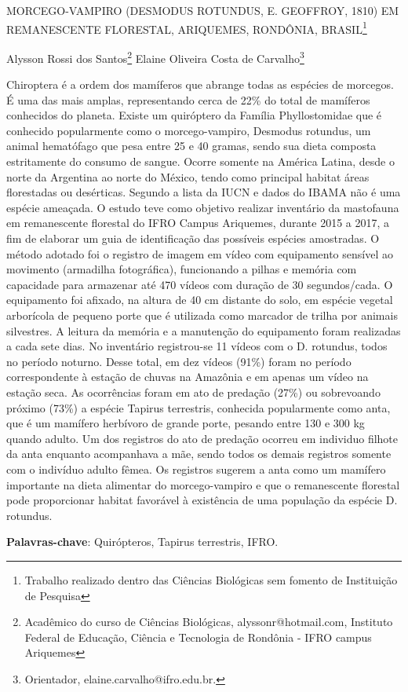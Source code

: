 \documentclass[article,12pt,onesidea,4paper,english,brazil]{abntex2}
\begin{document}
	
	
	\frenchspacing 
	
	\begin{center}
		\LARGE MORCEGO-VAMPIRO \MakeUppercase{(Desmodus rotundus, E. Geoffroy, 1810)} EM
		REMANESCENTE FLORESTAL, ARIQUEMES, RONDÔNIA, BRASIL\footnote{Trabalho realizado dentro das Ciências Biológicas sem fomento de Instituição de Pesquisa}
		
		\normalsize
		Alysson Rossi dos Santos\footnote{Acadêmico do curso de Ciências Biológicas, alyssonr@hotmail.com, Instituto Federal de Educação,
			Ciência e Tecnologia de Rondônia - IFRO campus Ariquemes} 
		Elaine Oliveira Costa de Carvalho\footnote{Orientador, elaine.carvalho@ifro.edu.br.} 
		
	\end{center}
	
	\noindent Chiroptera é a ordem dos mamíferos que abrange todas as espécies de morcegos.
	É uma das mais amplas, representando cerca de 22\% do total de mamíferos
	conhecidos do planeta. Existe um quiróptero da Família Phyllostomidae que é
	conhecido popularmente como o morcego-vampiro, Desmodus rotundus, um animal
	hematófago que pesa entre 25 e 40 gramas, sendo sua dieta composta estritamente
	do consumo de sangue. Ocorre somente na América Latina, desde o norte da
	Argentina ao norte do México, tendo como principal habitat áreas florestadas ou
	desérticas. Segundo a lista da IUCN e dados do IBAMA não é uma espécie
	ameaçada. O estudo teve como objetivo realizar inventário da mastofauna em
	remanescente florestal do IFRO Campus Ariquemes, durante 2015 a 2017, a fim de
	elaborar um guia de identificação das possíveis espécies amostradas. O método
	adotado foi o registro de imagem em vídeo com equipamento sensível ao movimento
	(armadilha fotográfica), funcionando a pilhas e memória com capacidade para
	armazenar até 470 vídeos com duração de 30 segundos/cada. O equipamento foi
	afixado, na altura de 40 cm distante do solo, em espécie vegetal arborícola de
	pequeno porte que é utilizada como marcador de trilha por animais silvestres. A
	leitura da memória e a manutenção do equipamento foram realizadas a cada sete
	dias. No inventário registrou-se 11 vídeos com o D. rotundus, todos no período
	noturno. Desse total, em dez vídeos (91\%) foram no período correspondente à
	estação de chuvas na Amazônia e em apenas um vídeo na estação seca. As
	ocorrências foram em ato de predação (27\%) ou sobrevoando próximo (73\%) a
	espécie Tapirus terrestris, conhecida popularmente como anta, que é um mamífero
	herbívoro de grande porte, pesando entre 130 e 300 kg quando adulto. Um dos
	registros do ato de predação ocorreu em individuo filhote da anta enquanto
	acompanhava a mãe, sendo todos os demais registros somente com o indivíduo
	adulto fêmea. Os registros sugerem a anta como um mamífero importante na dieta
	alimentar do morcego-vampiro e que o remanescente florestal pode proporcionar
	habitat favorável à existência de uma população da espécie D. rotundus.
	
	\vspace{\onelineskip}
	
	\noindent
	\textbf{Palavras-chave}: Quirópteros, Tapirus terrestris, IFRO.
	
\end{document}
